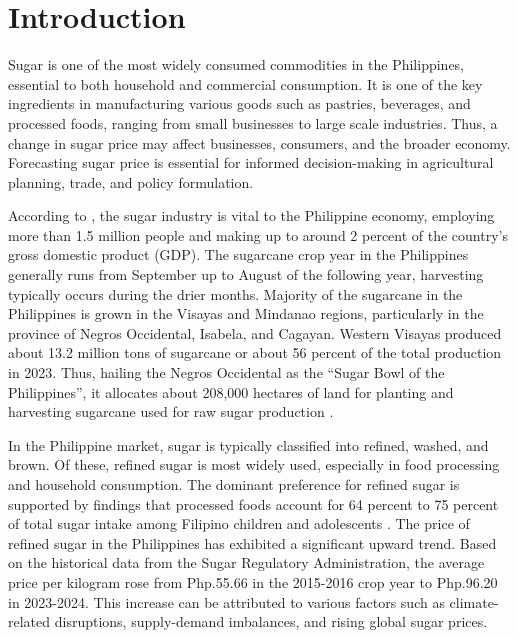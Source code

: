 \documentclass[11pt]{article}
\begin{document}
\newpage
\thispagestyle{empty}
\tableofcontents
\newpage

\section{Introduction}
 Sugar is one of the most widely consumed commodities in the Philippines, essential to both household and commercial consumption. It is one of the key ingredients in manufacturing various goods such as pastries, beverages, and processed foods, ranging from small businesses to large scale industries. Thus, a change in sugar price may affect businesses, consumers, and the broader economy. Forecasting sugar price is essential for informed decision-making in agricultural planning, trade, and policy formulation. 

According to \citet{tabuco-2023}, the sugar industry is vital to the Philippine economy, employing more than 1.5 million people and making up to around 2 percent of the country’s gross domestic product (GDP). The sugarcane crop year in the Philippines generally runs from September up to August of the following year, harvesting typically occurs during the drier months. Majority of the sugarcane in the Philippines is grown in the Visayas and Mindanao regions, particularly in the province of Negros Occidental, Isabela, and Cagayan. Western Visayas produced about 13.2 million tons of sugarcane or about 56 percent of the total production in 2023. Thus, hailing the Negros Occidental as the “Sugar Bowl of the Philippines”, it allocates about 208,000 hectares of land for planting and harvesting sugarcane used for raw sugar production \citep{balita-2024A}.   

\indent In the Philippine market, sugar is typically classified into refined, washed, and 
brown. Of these, refined sugar is most widely used, especially in food processing and household consumption.  The dominant preference for refined sugar is supported by findings that processed foods account for 64 percent to 75 percent of total sugar intake among Filipino children and adolescents \citep{amarra-2024}. The price of refined sugar in the Philippines has exhibited a significant upward trend. Based on the historical data from the Sugar Regulatory Administration, the average price per kilogram rose from Php.55.66 in the 2015-2016 crop year to Php.96.20 in 2023-2024. This increase can be attributed to various factors such as climate-related disruptions, supply-demand imbalances, and rising global sugar prices. 
\end{document}

